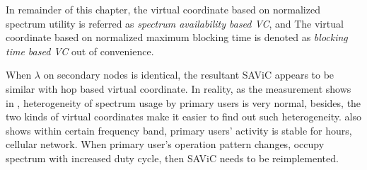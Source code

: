 



In remainder of this chapter, the virtual coordinate based on normalized spectrum utility is referred as \textit{spectrum availability based VC}, and The virtual coordinate based on normalized maximum blocking time is denoted as \textit{blocking time based VC} out of convenience.


 

When $\lambda$ on secondary nodes is identical, the resultant SAViC appears to be similar with hop based virtual coordinate.
In reality, as the measurement shows in \cite{measurement_Palaios14}, heterogeneity of spectrum usage by primary users is very normal, besides, the two kinds of virtual coordinates make it easier to find out such heterogeneity.
\cite{measurement_Palaios14} also shows within certain frequency band, primary users' activity is stable for hours, \eg cellular network.
When primary user's operation pattern changes, \eg occupy spectrum with increased duty cycle, then SAViC needs to be reimplemented.

